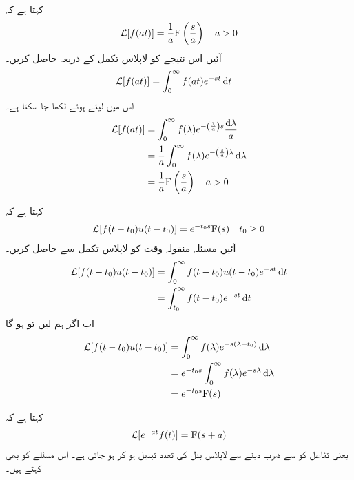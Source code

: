  کہتا ہے کہ
\begin{align}
\mathcal{L}[f(at)]=\frac{1}{a} {{\textup{F}}}\left(\frac{s}{a}\right) \quad a>0
\end{align}
آئیں اس نتیجے کو لاپلاس تکمل کے ذریعہ حاصل کریں۔
\begin{align*}
\Laplace[f(at)]&=\int_0^{\infty} f(at) e^{-st} \dif t
\end{align*}
اس میں  لیتے ہوئے  لکھا جا سکتا ہے۔
\begin{align*}
\Laplace[f(at)]&=\int_0^{\infty} f(\lambda) e^{-\left(\frac{\lambda}{a}\right)s} \frac{\dif \lambda}{a}\\
&=\frac{1}{a}\int_0^{\infty} f(\lambda) e^{-\left(\frac{s}{a}\right)\lambda } \dif \lambda\\
&=\frac{1}{a} \bF\left(\frac{s}{a}\right) \quad a>0
\end{align*}

 کہتا ہے کہ
\begin{align}\label{مساوات_لاپلاس_مسئلہ_منتقلی_وقت}
\mathcal{L}[f(t-t_0)u(t-t_0)]=e^{-t_0 s}{{\textup{F}}}(s) \quad t_0\ge 0
\end{align}
آئیں مسئلہ منقولہ وقت کو لاپلاس تکمل سے حاصل کریں۔
\begin{align*}
\Laplace[f(t-t_0)u(t-t_0)]&=\int_{0}^{\infty} f(t-t_0) u(t-t_0)e^{-st} \dif t\\
&=\int_{t_0}^{\infty} f(t-t_0)e^{-st} \dif t\\
\end{align*}
اب اگر ہم  لیں تو  ہو گا
\begin{align*}
\Laplace[f(t-t_0)u(t-t_0)]&=\int_{0}^{\infty} f(\lambda)e^{-s\left(\lambda+t_0\right)} \dif \lambda\\
&=e^{-t_0 s}\int_0^{\infty}f(\lambda)e^{-s\lambda}\dif \lambda\\
&=e^{-t_0 s}\bF(s)
\end{align*}

 کہتا ہے کہ
\begin{align}
\mathcal{L}[e^{-at} f(t)]={{\textup{F}}}(s+a)
\end{align}
یعنی تفاعل کو  سے ضرب دینے سے لاپلاس بدل کی تعدد تبدیل ہو کر  ہو جاتی ہے۔ اس مسئلے کو  بھی کہتے ہیں۔

